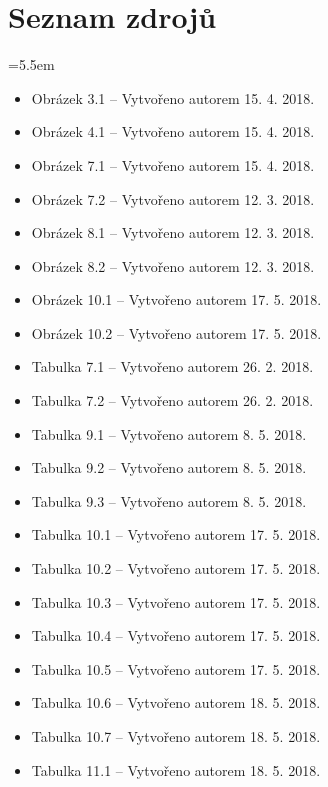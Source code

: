 \appendix

\chapter{Seznam zdrojů}

\medskip
\bgroup \leftskip=5.5em

\begin{itemize}
	
	\item Obrázek 3.1 -- Vytvořeno autorem 15. 4. 2018.
	
	\item Obrázek 4.1 -- Vytvořeno autorem 15. 4. 2018.
	
	\item Obrázek 7.1 -- Vytvořeno autorem 15. 4. 2018.
	
	\item Obrázek 7.2 -- Vytvořeno autorem 12. 3. 2018.
	
	\item Obrázek 8.1 -- Vytvořeno autorem 12. 3. 2018.
	
	\item Obrázek 8.2 -- Vytvořeno autorem 12. 3. 2018.
	
	\item Obrázek 10.1 -- Vytvořeno autorem 17. 5. 2018.
	
	\item Obrázek 10.2 -- Vytvořeno autorem 17. 5. 2018.
	
	\item Tabulka 7.1 -- Vytvořeno autorem 26. 2. 2018.
	
	\item Tabulka 7.2 -- Vytvořeno autorem 26. 2. 2018.
	
	\item Tabulka 9.1 -- Vytvořeno autorem 8. 5. 2018.
	
	\item Tabulka 9.2 -- Vytvořeno autorem 8. 5. 2018.
	
	\item Tabulka 9.3 -- Vytvořeno autorem 8. 5. 2018.
	
	\item Tabulka 10.1 -- Vytvořeno autorem 17. 5. 2018.
	
	\item Tabulka 10.2 -- Vytvořeno autorem 17. 5. 2018.
	
	\item Tabulka 10.3 -- Vytvořeno autorem 17. 5. 2018.
	
	\item Tabulka 10.4 -- Vytvořeno autorem 17. 5. 2018.
	
	\item Tabulka 10.5 -- Vytvořeno autorem 17. 5. 2018.
	
	\item Tabulka 10.6 -- Vytvořeno autorem 18. 5. 2018.
	
	\item Tabulka 10.7 -- Vytvořeno autorem 18. 5. 2018.
	
	\item Tabulka 11.1 -- Vytvořeno autorem 18. 5. 2018.
	
\end{itemize}

\par\egroup